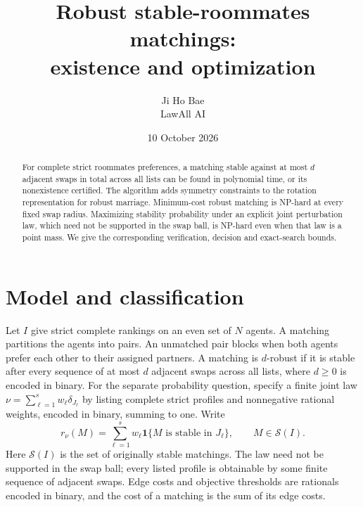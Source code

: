 \documentclass[11pt]{article}
\title{Robust stable-roommates matchings:\\existence and optimization}
\author{Ji Ho Bae\\\small LawAll AI}
\date{10 October 2026}
\begin{document}
\maketitle
\begin{abstract}
For complete strict roommates preferences, a matching stable against
at most $d$ adjacent swaps in total across all lists can be found in polynomial time,
or its nonexistence certified. The algorithm adds symmetry constraints
to the rotation representation for robust marriage. Minimum-cost robust
matching is NP-hard at every fixed swap radius. Maximizing stability
probability under an explicit joint perturbation law, which need not be
supported in the swap ball, is NP-hard even when that law is a point
mass. We give the corresponding verification,
decision and exact-search bounds.
\end{abstract}

\section{Model and classification}
Let $I$ give strict complete rankings on an even set of $N$ agents.
A matching partitions the agents into pairs. An unmatched pair blocks
when both agents prefer each other to their assigned partners.
A matching is $d$-robust if it is stable after every sequence of at most
$d$ adjacent swaps across all lists, where $d\geq0$ is encoded in binary.
For the separate probability question, specify a finite joint law
$\nu=\sum_{\ell=1}^s w_\ell\delta_{J_\ell}$ by listing complete strict
profiles and nonnegative rational weights, encoded in binary, summing
to one. Write
\[
 r_\nu(M)=\sum_{\ell=1}^s w_\ell
       \mathbf1\{M\text{ is stable in }J_\ell\},\qquad M\in\mathcal S(I).
\]
Here $\mathcal S(I)$ is the set of originally stable matchings. The law
need not be supported in the swap ball; every listed profile is obtainable
by some finite sequence of adjacent swaps. Edge costs and objective
thresholds are rationals encoded in binary, and the cost of a matching
is the sum of its edge costs.
\end{document}
